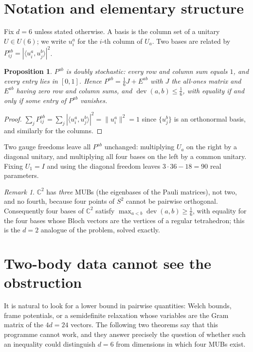 \documentclass[11pt,a4paper]{article}
\newtheorem{proposition}[theorem]{Proposition}
\theoremstyle{remark}
\newtheorem{remark}[theorem]{Remark}
\newcommand{\C}{\mathbb{C}}
\newcommand{\dev}{\operatorname{dev}}
\begin{document}
\section{Notation and elementary structure}
\label{sec:notation}

Fix $d=6$ unless stated otherwise.  A basis is the column set of a unitary $U\in U(6)$; we
write $u^a_i$ for the $i$-th column of $U_a$.  Two bases are related by
$P^{ab}_{ij}=|\langle u^a_i,u^b_j\rangle|^2$.

\begin{proposition}\label{prop:ds}
$P^{ab}$ is doubly stochastic: every row and column sum equals $1$, and every entry lies in
$[0,1]$.  Hence $P^{ab}=\tfrac16 J+E^{ab}$ with $J$ the all-ones matrix and $E^{ab}$ having
zero row and column sums, and $\dev(a,b)\le\tfrac16$, with equality if and only if some entry
of $P^{ab}$ vanishes.
\end{proposition}
\begin{proof}
$\sum_j P^{ab}_{ij}=\sum_j|\langle u^a_i,u^b_j\rangle|^2=\|u^a_i\|^2=1$ since $\{u^b_j\}$ is
an orthonormal basis, and similarly for the columns.
\end{proof}

Two gauge freedoms leave all $P^{ab}$ unchanged: multiplying $U_a$ on the right by a diagonal
unitary, and multiplying all four bases on the left by a common unitary.  Fixing $U_1=I$ and
using the diagonal freedom leaves $3\cdot 36-18=90$ real parameters.

\begin{remark}
$\C^2$ has \emph{three} MUBs (the eigenbases of the Pauli matrices), not two, and no fourth,
because four points of $S^2$ cannot be pairwise orthogonal.  Consequently four bases of
$\C^2$ satisfy $\max_{a<b}\dev(a,b)\ge\tfrac16$, with equality for the four bases whose Bloch
vectors are the vertices of a regular tetrahedron; this is the $d=2$ analogue of the problem,
solved exactly.
\end{remark}

\section{Two-body data cannot see the obstruction}
\label{sec:nogo}

It is natural to look for a lower bound in pairwise quantities: Welch bounds, frame
potentials, or a semidefinite relaxation whose variables are the Gram matrix of the $4d=24$
vectors.  The following two theorems say that this programme cannot work, and they answer
precisely the question of whether such an inequality could distinguish $d=6$ from dimensions
in which four MUBs exist.
\end{document}
